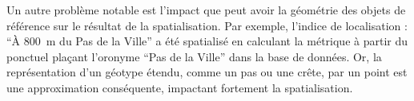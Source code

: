 
Un autre problème notable est l'impact que peut avoir la géométrie des
objets de référence sur le résultat de la spatialisation. Par exemple,
l'indice de localisation : \enquote{À \SI{800}{\meter} du Pas de la
  Ville} a été spatialisé en calculant la métrique
 à partir du ponctuel plaçant l'oronyme
\enquote{Pas de la Ville} dans la base de données. Or, la
représentation d'un géotype étendu, comme un pas ou une crête, par un
point est une approximation conséquente, impactant fortement la
spatialisation.


